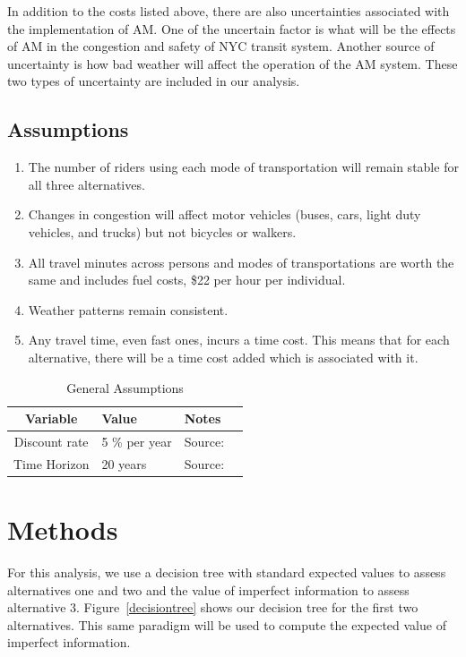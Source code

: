 \documentclass[11pt, letterpaper]{article}
\begin{document}
In addition to the costs listed above, there are also uncertainties associated 
with the implementation of AM. One of the uncertain factor is what will be the effects
of AM in the congestion and safety of NYC transit system. Another source of 
uncertainty is how bad weather will affect the operation of the AM system. These two
types of uncertainty are included in our analysis.

\subsection{Assumptions}

\begin{enumerate}[leftmargin=*]
\item The number of riders using each mode of transportation will remain
  stable for all three alternatives.
\item Changes in congestion will affect motor vehicles (buses, cars,
  light duty vehicles, and trucks) but not bicycles or walkers.
\item All travel minutes across persons and modes of transportations
  are worth the same and includes fuel costs, \$22 per hour per individual.
\item Weather patterns remain consistent.
\item Any travel time, even fast ones, incurs a time cost.  This means
  that for each alternative, there will be a time cost added which is
  associated with it.
\end{enumerate}

\begin{table}[h]
\caption{General Assumptions}
\centering
\renewcommand{\arraystretch}{1.1}
\begin{tabular}{c l l l}
\hline
Variable 							& Value 				& Notes 			\\\hline\hline
Discount rate						& 5 \% per year			& Source:			\\
Time Horizon						& 20 years			& Source:			\\\hline
\end{tabular}
\label{tab:assumptions}
\end{table}%


\section{Methods}

For this analysis, we use a decision tree with standard expected
values to assess alternatives one and two and the value of imperfect
information to assess alternative 3.  Figure~\ref{decisiontree} shows
our decision tree for the first two alternatives.  This same paradigm
will be used to compute the expected value of imperfect information.
\end{document}

